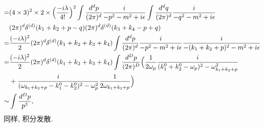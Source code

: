 \begin{itemize}
\begin{align}
		=& (4 \times 3)^2 \times 2 \times \Big( \frac{- i \lambda}{4!} \Big)^2 \int \frac{d^d p}{(2 \pi)^d} \frac{i}{- p^2 - m^2 + i \epsilon} \int \frac{d^d q}{(2 \pi)^d} \frac{i}{- q^2 - m^2 + i \epsilon} \notag \\
		& (2 \pi)^d \delta^{(d)}(k_1 + k_2 + p - q) (2 \pi)^d \delta^{(d)}(k_3 + k_4 - p + q) \label{3.3.17} \\
		=& \frac{(- i \lambda)^2}{2} (2 \pi)^d \delta^{(d)}(k_1 + k_2 + k_3 + k_4) \int \frac{d^d p}{(2 \pi)^d} \frac{i}{- p^2 - m^2 + i \epsilon} \frac{i}{- (k_1 + k_2 + p)^2 - m^2 + i \epsilon} \notag \\
		=& \frac{(- i \lambda)^2}{2} (2 \pi)^d \delta^{(d)}(k_1 + k_2 + k_3 + k_4) \int \frac{d^D p}{(2 \pi)^D} \Big( \frac{1}{2 \omega_p} \frac{i}{(k_1^0 + k_2^0 - \omega_p)^2 - \omega_{k_1 + k_2 + p}^2} \notag \\
		& + \frac{i}{(\omega_{k_1 + k_2 + p} - k_1^0 - k_2^0)^2 - \omega_p^2} \frac{1}{2 \omega_{k_1 + k_2 + p}} \Big) \label{3.3.18} \\
		\sim & \int \frac{d^D p}{p^3},
	\end{align}
	同样, 积分发散.
\end{itemize}
